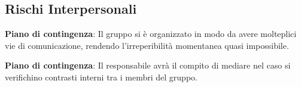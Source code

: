 	\subsection{Rischi Interpersonali}
		\def\productquality{
			{
        			Irreperibilita
				momentanea
				RI1,
        			Potrebbero verificarsi momenti in cui uno o più membri del team siano irreperibili, 
        			è responsabilità di ogni membro del gruppo comunicare eventuali imprevisti e organizzarsi in modo da non ostacolare il calendario delle consegne,
        			Occorrenza: Bassa 
				Pericolosità: Media
    			},
		}
		
		\textbf{Piano di contingenza}: Il gruppo si è organizzato in modo da avere molteplici vie di comunicazione, rendendo l'irreperibilità momentanea quasi impossibile.
		\pagebreak
		\def\productquality{
			{
        			Contrasti 
				interni
				RI2,
        			Potrebbero verificarsi divergenze tra i membri del gruppo, 
        			Ciascuno dei membri del team si impegna ad agire al fine di non ostacolare il naturale svolgimento del progetto e discutere di eventuali problemi solo in seduta di riunione,
        			Occorrenza: Bassa 
				Pericolosità: Media
    			},
		}
		
		\textbf{Piano di contingenza}: Il responsabile avrà il compito di mediare nel caso si verifichino contrasti interni tra i membri del gruppo.
